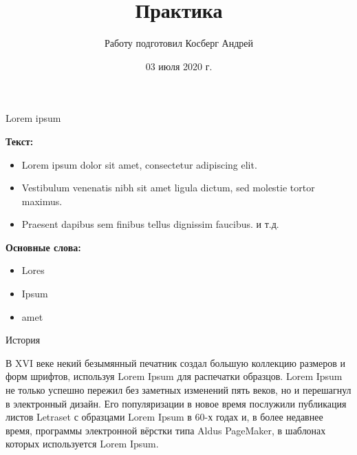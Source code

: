 \documentclass{beamer}
\begin{document}
\title {Практика}

\author {Работу подготовил Косберг Андрей}


\date{03 июля 2020 г.}

\begin{frame}

\titlepage

\end{frame}



\begin{frame}{Lorem ipsum}

\textbf{Текст:}

\begin{itemize}

\item Lorem ipsum dolor sit amet, consectetur adipiscing elit.

\item Vestibulum venenatis nibh sit amet ligula dictum, sed molestie tortor maximus.

\item   Praesent dapibus sem finibus tellus dignissim faucibus. и т.д.

\end{itemize}

\textbf{Основные слова:}

\begin{itemize}

\item Lores

\item Ipsum

\item amet



\end{itemize}

\end{frame}



\begin{frame}{История}



 В XVI веке некий безымянный печатник создал большую коллекцию размеров и форм шрифтов, используя Lorem Ipsum для распечатки образцов. Lorem Ipsum не только успешно пережил без заметных изменений пять веков, но и перешагнул в электронный дизайн. Его популяризации в новое время послужили публикация листов Letraset с образцами Lorem Ipsum в 60-х годах и, в более недавнее время, программы электронной вёрстки типа Aldus PageMaker, в шаблонах которых используется Lorem Ipsum.


\end{frame}
\end{document}

